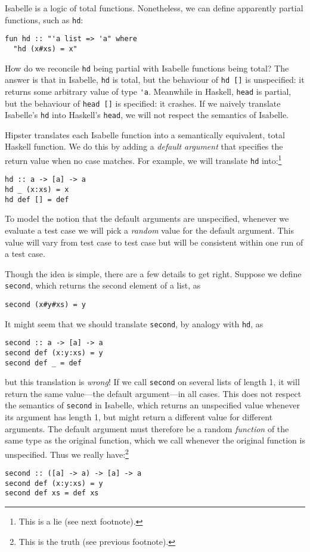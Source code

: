 Isabelle is a logic of total functions. Nonetheless, we can define
apparently partial functions, such as \verb|hd|:
\begin{verbatim}
fun hd :: "'a list => 'a" where
  "hd (x#xs) = x"
\end{verbatim}

How do we reconcile \verb|hd| being partial with Isabelle functions
being total? The answer is that in Isabelle, \verb|hd| is total, but
the behaviour of \verb|hd []| is unspecified: it returns some
arbitrary value of type \verb|'a|. Meanwhile in Haskell, \verb|head|
is partial, but the behaviour of \verb|head []| is specified: it
crashes. If we naively translate Isabelle's \verb|hd| into Haskell's
\verb|head|, we will not respect the semantics of Isabelle.

Hipster translates each Isabelle function into a semantically
equivalent, total Haskell function. We do this by adding
a \emph{default argument} that specifies the return value when no case
matches. For example, we will translate \verb|hd| into:\footnote{This is a lie (see next footnote).}
\begin{verbatim}
hd :: a -> [a] -> a
hd _ (x:xs) = x
hd def [] = def
\end{verbatim}
To model the notion that the default arguments are unspecified,
whenever we evaluate a test case we will pick a \emph{random} value
for the default argument. This value will vary from test case to test
case but will be consistent within one run of a test case.

Though the idea is simple, there are a few details to get right.
Suppose we define \verb|second|, which returns the second element of a list, as
\begin{verbatim}
second (x#y#xs) = y
\end{verbatim}
It might seem that we should translate \verb|second|, by analogy with \verb|hd|, as
\begin{verbatim}
second :: a -> [a] -> a
second def (x:y:xs) = y
second def _ = def
\end{verbatim}
but this translation is \emph{wrong}! If we call \verb|second| on
several lists of length 1, it will return the same value---the default
argument---in all cases. This does not respect the semantics of \verb|second|
in Isabelle, which returns an unspecified value whenever its argument
has length 1, but might return a different value for different arguments.
The default argument must therefore be a random \emph{function}
of the same type as the original function, which we call whenever the
original function is unspecified. Thus we really have:\footnote{This is the truth (see previous footnote).}
\begin{verbatim}
second :: ([a] -> a) -> [a] -> a
second def (x:y:xs) = y
second def xs = def xs
\end{verbatim}

